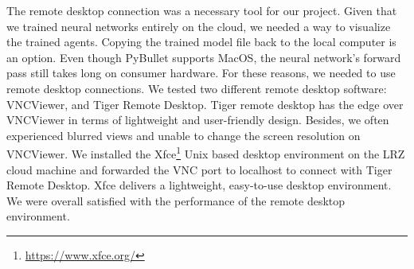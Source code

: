 The remote desktop connection was a necessary tool for our project. Given that we trained neural networks entirely on the cloud, we needed a way to visualize the trained agents. Copying the trained model file back to the local computer is an option. Even though PyBullet supports MacOS, the neural network's forward pass still takes long on consumer hardware. For these reasons, we needed to use remote desktop connections. We tested two different remote desktop software: VNCViewer, and Tiger Remote Desktop. Tiger remote desktop has the edge over VNCViewer in terms of lightweight and user-friendly design. Besides, we often experienced blurred views and unable to change the screen resolution on VNCViewer. We installed the Xfce\footnote{\url{https://www.xfce.org/}} Unix based desktop environment on the LRZ cloud machine and forwarded the VNC port to localhost to connect with Tiger Remote Desktop. Xfce delivers a lightweight, easy-to-use desktop environment. We were overall satisfied with the performance of the remote desktop environment. 

